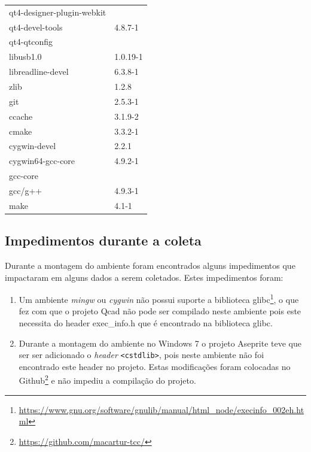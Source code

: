 \begin{itemize}
\begin{table}[h]
\begin{tabular}{ll}
qt4-designer-plugin-webkit  & \\
qt4-devel-tools & 4.8.7-1 \\ 
qt4-qtconfig & \\ \midrule

libusb1.0 & 1.0.19-1 \\ \midrule


libreadline-devel & 6.3.8-1 \\ \midrule

zlib & 1.2.8 \\ \midrule
git & 2.5.3-1 \\ \midrule
ccache & 3.1.9-2 \\ \midrule
cmake & 3.3.2-1 \\ \midrule
cygwin-devel & 2.2.1 \\ \midrule
cygwin64-gcc-core & 4.9.2-1 \\ \midrule
gcc-core & \\ \midrule
gcc/g++ & 4.9.3-1 \\ 
make & 4.1-1 \\ \bottomrule
\end{tabular} 
\end{table}
\end{itemize}

\subsection{Impedimentos durante a coleta}
\label{impedimentos_durante_a_coleta}

	Durante a montagem do ambiente foram encontrados
 alguns impedimentos que impactaram em alguns dados a serem coletados.
Estes impedimentos foram:
 
	\begin{enumerate}[label=\roman* )]
		\item Um ambiente \textit{mingw} ou \textit{cygwin} não possui suporte
 a biblioteca glibc\footnote{\url{https://www.gnu.org/software/gnulib/manual/html\_node/execinfo\_002eh.html}},
 o que fez com que o projeto Qcad não pode ser compilado neste ambiente pois este necessita do header exec\_info.h que é encontrado na biblioteca glibc.
		\item Durante a montagem do ambiente no Windows 7 o projeto Aseprite teve que ser  
 ser adicionado o \textit{header} \texttt{<cstdlib>}, pois neste ambiente não foi
 encontrado este header no projeto. Estas modificações foram colocadas no
 Github\footnote{\url{https://github.com/macartur-tcc/}} e não impediu a
 compilação do projeto.
	\end{enumerate}


